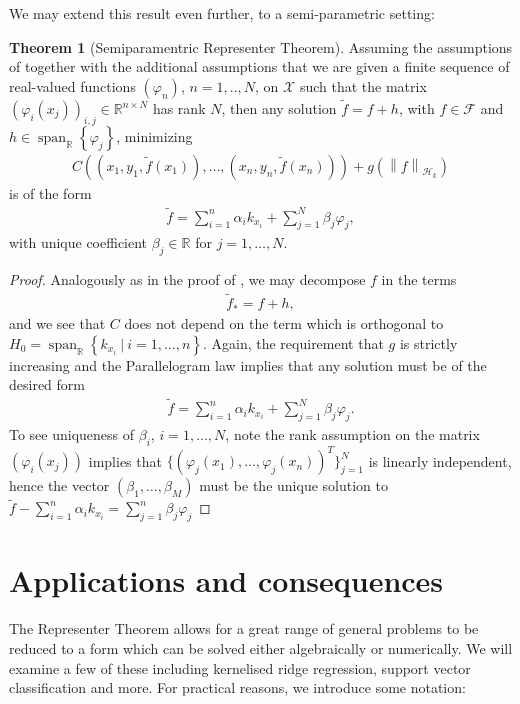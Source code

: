 \documentclass[10pt,twoside,openany,final]{memoir}
\theoremstyle{definition}
\newtheorem{theorem}{Theorem}[chapter]
\theoremstyle{Break}
\newcommand{\lv}{\left\lVert}
\newcommand{\rv}{\right\rVert}
\newcommand{\R}{\mathbb{R}}
\renewcommand{\H}{\mathcal{H}}
\DeclareMathOperator{\Span}{span}
\begin{document}
We may extend this result even further, to a semi-parametric setting:
\begin{theorem}[Semiparamentric Representer Theorem]
	Assuming the assumptions of 	together with the additional assumptions that we are given a finite sequence of real-valued functions $(\varphi_n)$, $n=1,..,N$, on $\mathcal{X}$ such that the matrix $(\varphi_i(x_j))_{i,j} \in \R^{n \times N}$ has rank $N$, then any solution $\tilde{f} = f + h$, with $f \in \mathcal{F}$ and $h \in \Span_\R\left\{ \varphi_j \right\}$, minimizing
	\begin{align*}
		C\left( (x_1,y_1,\tilde{f}(x_1)),\dots,(x_n,y_n,\tilde{f}(x_n)) \right)+g(\lv f\rv_{\H_k})		
	\end{align*}
	is of the form
	\begin{align*}
		\tilde{f} =\sum_{i=1}^n \alpha_i k_{x_i} + \sum_{j=1}^N \beta_j \varphi_j,
	\end{align*}
	with unique coefficient $\beta_j \in \R$ for $j=1,\dots,N$.
	\label{semip}
\end{theorem}
\begin{proof}
	Analogously as in the proof of , we may decompose $f$ in the terms
	\begin{align*}
		\tilde{f}_*=f+h,
	\end{align*}
	and we see that $C$ does not depend on the term which is orthogonal to $H_0 = \Span_\R\left\{ k_{x_i} \ | \ i=1,\dots,n \right\}$. Again, the requirement that $g$ is strictly increasing and the Parallelogram law implies that any solution must be of the desired form
	\begin{align*}
		\tilde{f} =\sum_{i=1}^n \alpha_i k_{x_i} + \sum_{j=1}^N \beta_j \varphi_j.
	\end{align*}
	To see uniqueness of $\beta_i$, $i = 1,\dots,N$, note the rank assumption on the matrix $(\varphi_i(x_j))$ implies that $\{(\varphi_j(x_1),\dots,\varphi_j(x_n))^T\}_{j=1}^N$ is linearly independent, hence the vector $(\beta_1,\dots,\beta_M)$ must be the unique solution to $\tilde{f}-\sum_{i=1}^n \alpha_i k_{x_i} = \sum_{j=1}^n \beta_j \varphi_j$
\end{proof}
\chapter{Applications and consequences}
The Representer Theorem allows for a great range of general problems to be reduced to a form which can be solved either algebraically or numerically. We will examine a few of these including kernelised ridge regression, support vector classification and more. For practical reasons, we introduce some notation:
\end{document}
